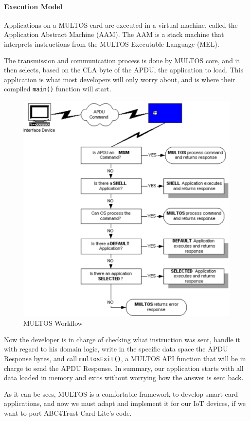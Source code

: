 \paragraph{Execution Model}
Applications on a MULTOS card are executed in a virtual machine, called the Application Abstract Machine (AAM). The AAM is a stack machine that interprets instructions from the MULTOS Executable
Language (MEL).

The transmission and communication process is done by MULTOS core, and it then selects, based on the CLA byte of the APDU, the application to load. This application is what most developers will only worry about, and is where their compiled \texttt{main()} function will start.

\begin{figure}[bth]
	\begin{center}
		\includegraphics[width=0.6\linewidth]{gfx/multosWorkflow}
	\end{center}
	\caption{MULTOS Workflow}
	\label{fig:multosWorkflow}
\end{figure}

Now the developer is in charge of checking what instruction was sent, handle it with regard to his domain logic,  write in the specific data space the APDU Response bytes, and call \texttt{multosExit()}, a MULTOS API function that will be in charge to send the APDU Response.
In summary, our application starts with all data loaded in memory and exits without worrying how the answer is sent back.

As it can be sees, MULTOS is a comfortable framework to develop smart card applications, and now we must adapt and implement it for our IoT devices, if we want to port ABC4Trust Card Lite's code.



